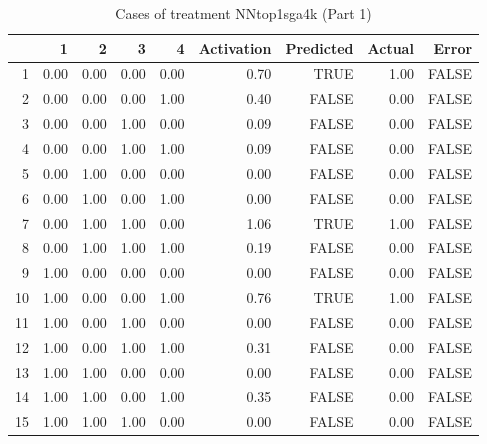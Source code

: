\begin{table}[ht]
\centering
\begin{tabular}{rrrrrrrrr}
  \hline
 & 1 & 2 & 3 & 4 & Activation & Predicted & Actual & Error \\ 
  \hline
1 & 0.00 & 0.00 & 0.00 & 0.00 & 0.70 & TRUE & 1.00 & FALSE \\ 
  2 & 0.00 & 0.00 & 0.00 & 1.00 & 0.40 & FALSE & 0.00 & FALSE \\ 
  3 & 0.00 & 0.00 & 1.00 & 0.00 & 0.09 & FALSE & 0.00 & FALSE \\ 
  4 & 0.00 & 0.00 & 1.00 & 1.00 & 0.09 & FALSE & 0.00 & FALSE \\ 
  5 & 0.00 & 1.00 & 0.00 & 0.00 & 0.00 & FALSE & 0.00 & FALSE \\ 
  6 & 0.00 & 1.00 & 0.00 & 1.00 & 0.00 & FALSE & 0.00 & FALSE \\ 
  7 & 0.00 & 1.00 & 1.00 & 0.00 & 1.06 & TRUE & 1.00 & FALSE \\ 
  8 & 0.00 & 1.00 & 1.00 & 1.00 & 0.19 & FALSE & 0.00 & FALSE \\ 
  9 & 1.00 & 0.00 & 0.00 & 0.00 & 0.00 & FALSE & 0.00 & FALSE \\ 
  10 & 1.00 & 0.00 & 0.00 & 1.00 & 0.76 & TRUE & 1.00 & FALSE \\ 
  11 & 1.00 & 0.00 & 1.00 & 0.00 & 0.00 & FALSE & 0.00 & FALSE \\ 
  12 & 1.00 & 0.00 & 1.00 & 1.00 & 0.31 & FALSE & 0.00 & FALSE \\ 
  13 & 1.00 & 1.00 & 0.00 & 0.00 & 0.00 & FALSE & 0.00 & FALSE \\ 
  14 & 1.00 & 1.00 & 0.00 & 1.00 & 0.35 & FALSE & 0.00 & FALSE \\ 
  15 & 1.00 & 1.00 & 1.00 & 0.00 & 0.00 & FALSE & 0.00 & FALSE \\ 
   \hline
\end{tabular}
\caption{Cases of treatment NNtop1sga4k (Part 1)} 
\end{table}
